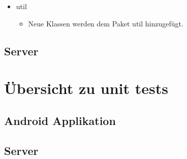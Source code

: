 \documentclass[a4paper]{scrreprt}
\begin{document}
\begin{itemize}
\begin{itemize}
\begin{itemize}
                            \end{itemize}
                  \end{itemize} 
                  \begin{itemize}
                        \item util
                            \begin{itemize}
                            \item Neue Klassen werden dem Paket util hinzugefügt.
                            \end{itemize}
                  \end{itemize}                                                
            
        \end{itemize}
       

        \section{Server}

       \newpage

    \chapter{Übersicht zu unit tests}

        \section{Android Applikation}

        \section{Server}

    \newpage
\end{document}
